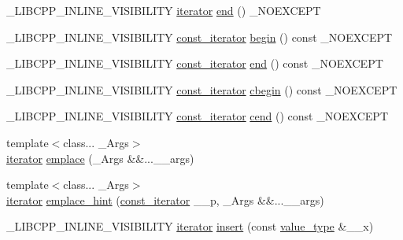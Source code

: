 \begin{DoxyCompactItemize}
\item 
\+\_\+\+L\+I\+B\+C\+P\+P\+\_\+\+I\+N\+L\+I\+N\+E\+\_\+\+V\+I\+S\+I\+B\+I\+L\+I\+T\+Y \hyperlink{classunordered__multimap_a7b508cae41ac3a258ca80609ec43db47}{iterator} \hyperlink{classunordered__multimap_ab093a3aafb8f8b93124ced836e868d14}{end} () \+\_\+\+N\+O\+E\+X\+C\+E\+P\+T
\item 
\+\_\+\+L\+I\+B\+C\+P\+P\+\_\+\+I\+N\+L\+I\+N\+E\+\_\+\+V\+I\+S\+I\+B\+I\+L\+I\+T\+Y \hyperlink{classunordered__multimap_a3cb373bd19680f9933781c04905fde39}{const\+\_\+iterator} \hyperlink{classunordered__multimap_a168e750308f83f2506f92cffd7a33379}{begin} () const \+\_\+\+N\+O\+E\+X\+C\+E\+P\+T
\item 
\+\_\+\+L\+I\+B\+C\+P\+P\+\_\+\+I\+N\+L\+I\+N\+E\+\_\+\+V\+I\+S\+I\+B\+I\+L\+I\+T\+Y \hyperlink{classunordered__multimap_a3cb373bd19680f9933781c04905fde39}{const\+\_\+iterator} \hyperlink{classunordered__multimap_ab43bf22a91f0bbb29f7fdb653c13371d}{end} () const \+\_\+\+N\+O\+E\+X\+C\+E\+P\+T
\item 
\+\_\+\+L\+I\+B\+C\+P\+P\+\_\+\+I\+N\+L\+I\+N\+E\+\_\+\+V\+I\+S\+I\+B\+I\+L\+I\+T\+Y \hyperlink{classunordered__multimap_a3cb373bd19680f9933781c04905fde39}{const\+\_\+iterator} \hyperlink{classunordered__multimap_a935d90f582bfb33e4dc134d5903bcc62}{cbegin} () const \+\_\+\+N\+O\+E\+X\+C\+E\+P\+T
\item 
\+\_\+\+L\+I\+B\+C\+P\+P\+\_\+\+I\+N\+L\+I\+N\+E\+\_\+\+V\+I\+S\+I\+B\+I\+L\+I\+T\+Y \hyperlink{classunordered__multimap_a3cb373bd19680f9933781c04905fde39}{const\+\_\+iterator} \hyperlink{classunordered__multimap_a5818121099bdb8a73b9d9a9c97d4c78d}{cend} () const \+\_\+\+N\+O\+E\+X\+C\+E\+P\+T
\item 
{\footnotesize template$<$class... \+\_\+\+Args$>$ }\\\hyperlink{classunordered__multimap_a7b508cae41ac3a258ca80609ec43db47}{iterator} \hyperlink{classunordered__multimap_a9b5388c7af556183b7504cc2aca69fb2}{emplace} (\+\_\+\+Args \&\&...\+\_\+\+\_\+args)
\item 
{\footnotesize template$<$class... \+\_\+\+Args$>$ }\\\hyperlink{classunordered__multimap_a7b508cae41ac3a258ca80609ec43db47}{iterator} \hyperlink{classunordered__multimap_a26178c9afb51d84ffb45d4b9e5abc4cc}{emplace\+\_\+hint} (\hyperlink{classunordered__multimap_a3cb373bd19680f9933781c04905fde39}{const\+\_\+iterator} \+\_\+\+\_\+p, \+\_\+\+Args \&\&...\+\_\+\+\_\+args)
\item 
\+\_\+\+L\+I\+B\+C\+P\+P\+\_\+\+I\+N\+L\+I\+N\+E\+\_\+\+V\+I\+S\+I\+B\+I\+L\+I\+T\+Y \hyperlink{classunordered__multimap_a7b508cae41ac3a258ca80609ec43db47}{iterator} \hyperlink{classunordered__multimap_a2136a2570da0e845ade5666b095493a7}{insert} (const \hyperlink{classunordered__multimap_a106d390dc0deafc47f10d3943b247ee6}{value\+\_\+type} \&\+\_\+\+\_\+x)

\end{DoxyCompactItemize}
